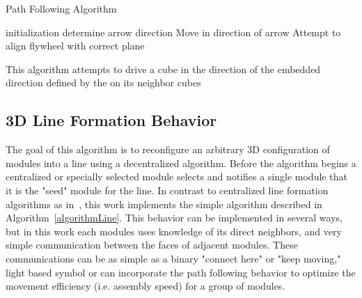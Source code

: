 \setcounter{algorithm}{-1}
\begin{algorithm}
	 
	\caption{Path Following Algorithm}
	\label{algorithmArrow}
	
	\SetAlgoLined
	initialization\;
	{
		determine arrow direction\;
		{
			Move in direction of arrow\;
		}
		{
			Attempt to align flywheel with correct plane\;
		}
	}
	\caption{This algorithm attempts to drive a cube in the direction of the embedded direction defined by the \tagName on its neighbor cubes}
\end{algorithm}







\subsection{3D Line Formation Behavior}
\label{ssec:algline}


The goal of this algorithm is to reconfigure an arbitrary 3D configuration of modules into a line using a decentralized algorithm. Before the algorithm begins 
a centralized or specially selected module selects and notifies a single module that it is the "seed" module for the line.  In contrast to centralized line formation algorithms as in~\cite{sung2015reconfiguration}, this work implements the simple algorithm described in Algorithm~\ref{algorithmLine}. This behavior can be implemented in several ways, but in this work each modules uses knowledge of its direct neighbors, and very simple communication between the faces of adjacent modules. These communications can be as simple as a binary "connect here" or "keep moving," light based symbol or can incorporate the path following behavior to optimize the movement efficiency (i.e. assembly speed) for a group of modules.

